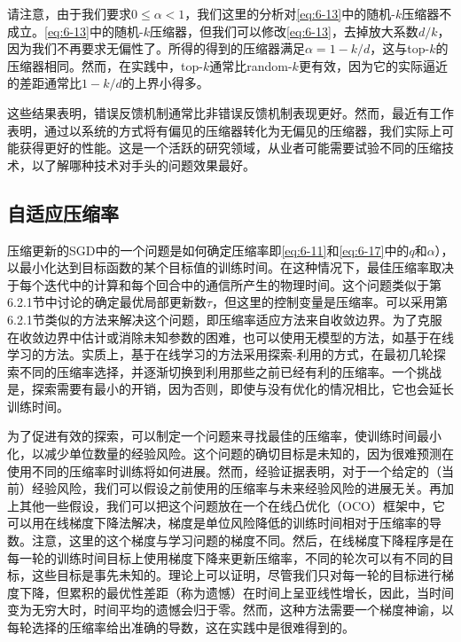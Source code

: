 请注意，由于我们要求$0 \le \alpha <1$，我们这里的分析对\ref{eq:6-13}中的随机-$k$压缩器不成立。\ref{eq:6-13}中的随机-$k$压缩器，但我们可以修改\ref{eq:6-13}，去掉放大系数$d/k$，因为我们不再要求无偏性了。所得的得到的压缩器满足$\alpha = 1-k/d$，这与top-$k$的压缩器相同。然而，在实践中，top-$k$通常比random-$k$更有效，因为它的实际逼近的差距通常比$1 -k/d$的上界小得多。

这些结果表明，错误反馈机制通常比非错误反馈机制表现更好。然而，最近有工作表明，通过以系统的方式将有偏见的压缩器转化为无偏见的压缩器，我们实际上可能获得更好的性能。这是一个活跃的研究领域，从业者可能需要试验不同的压缩技术，以了解哪种技术对手头的问题效果最好。
	
\subsection{自适应压缩率}
	
压缩更新的SGD中的一个问题是如何确定压缩率即\ref{eq:6-11}和\ref{eq:6-17}中的$q$和$\alpha$），以最小化达到目标函数的某个目标值的训练时间。在这种情况下，最佳压缩率取决于每个迭代中的计算和每个回合中的通信所产生的物理时间。这个问题类似于第6.2.1节中讨论的确定最优局部更新数$\tau$，但这里的控制变量是压缩率。可以采用第6.2.1节类似的方法来解决这个问题，即压缩率适应方法来自收敛边界。为了克服在收敛边界中估计或消除未知参数的困难，也可以使用无模型的方法，如基于在线学习的方法\cite{han2020adaptive}。实质上，基于在线学习的方法采用探索-利用的方式，在最初几轮探索不同的压缩率选择，并逐渐切换到利用那些之前已经有利的压缩率。一个挑战是，探索需要有最小的开销，因为否则，即使与没有优化的情况相比，它也会延长训练时间。
	
为了促进有效的探索，可以制定一个问题来寻找最佳的压缩率，使训练时间最小化，以减少单位数量的经验风险\cite{han2020adaptive}。这个问题的确切目标是未知的，因为很难预测在使用不同的压缩率时训练将如何进展。然而，经验证据表明，对于一个给定的（当前）经验风险，我们可以假设之前使用的压缩率与未来经验风险的进展无关。再加上其他一些假设，我们可以把这个问题放在一个在线凸优化（OCO）框架\cite{hazan2016introduction}中，它可以用在线梯度下降法解决，梯度是单位风险降低的训练时间相对于压缩率的导数。注意，这里的这个梯度与学习问题的梯度不同。然后，在线梯度下降程序是在每一轮的训练时间目标上使用梯度下降来更新压缩率，不同的轮次可以有不同的目标，这些目标是事先未知的。理论上可以证明，尽管我们只对每一轮的目标进行梯度下降，但累积的最优性差距（称为遗憾）在时间上呈亚线性增长，因此，当时间变为无穷大时，时间平均的遗憾会归于零。然而，这种方法需要一个梯度神谕，以每轮选择的压缩率给出准确的导数，这在实践中是很难得到的。
	
